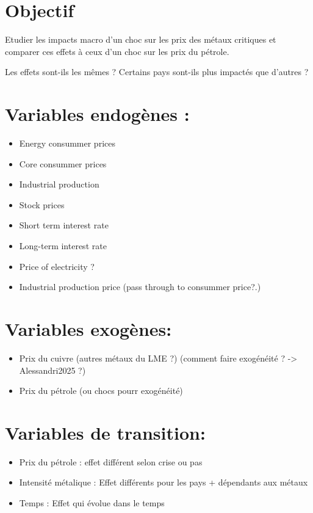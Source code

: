 \documentclass[11pt]{article}
\author{Romain Capliez}
\date{\today}
\title{}
\begin{document}
\tableofcontents

\section{Objectif}
\label{sec:org1be0248}

Etudier les impacts macro d'un choc sur les prix des métaux critiques et comparer ces effets à ceux d'un choc sur les prix du pétrole.

Les effets sont-ils les mêmes ?
Certains pays sont-ils plus impactés que d'autres ?

\section{Variables endogènes :}
\label{sec:orgc89b3a3}
\begin{itemize}
\item Energy consummer prices
\item Core consummer prices
\item Industrial production
\item Stock prices
\item Short term interest rate
\item Long-term interest rate
\item Price of electricity ?
\item Industrial production price (pass through to consummer price?.)
\end{itemize}

\section{Variables exogènes:}
\label{sec:orgddf725b}
\begin{itemize}
\item Prix du cuivre (autres métaux du LME ?) (comment faire exogénéité ? -> Alessandri2025 ?)
\item Prix du pétrole (ou chocs pourr exogénéité)
\end{itemize}

\section{Variables de transition:}
\label{sec:orgbc7ab05}
\begin{itemize}
\item Prix du pétrole : effet différent selon crise ou pas
\item Intensité métalique : Effet différents pour les pays + dépendants aux métaux
\item Temps : Effet qui évolue dans le temps
\end{itemize}
\end{document}
